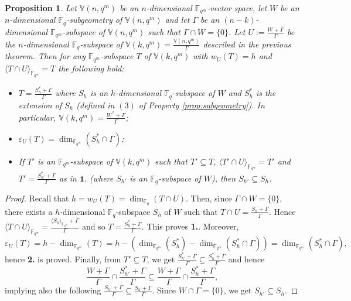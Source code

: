 \documentclass[11pt]{amsart}
\newtheorem{proposition}[theorem]{Proposition}
\newcommand{\fqm}{\mathbb{F}_{q^m}}
\newcommand{\fq}{{\mathbb F}_{q}}
\begin{document}
\begin{proposition} \label{prop:geometricdefect}
    Let $\mathbb{V}(n,q^m)$ be an $n$-dimensional $\fqm$-vector space, let $W$ be an $n$-dimensional $\fq$-subgeometry  of $\mathbb{V}(n,q^m)$  and let $\Gamma$ be an $(n-k)$-dimensional $\fqm$-subspace of $\mathbb{V}(n,q^m)$ such that  
      $\Gamma \cap W=\{ 0\}$. Let $U:=\frac{W+\Gamma}{\Gamma}$ be the $n$-dimensional  $\fq$-subspace of $\mathbb V(k,q^m)=\frac{\mathbb{V}(n,q^m)}{\Gamma}$ described in the previous theorem.
      Then for any $\fqm$-subspace $T$ of $\mathbb V(k,q^m)$ with $w_{U}(T)=h$ and $\langle T \cap U \rangle_{\fqm}=T$ the following hold:
      \begin{itemize}
          \item[\bf 1.] $T=\frac{S_h^*+\Gamma}{\Gamma}$ where $S_h$ is an $h$-dimensional $\fq$-subspace of $W$ and $S_h^*$ is the extension of $S_h$ (defined in $(3)$ of Property \ref{prop:subgeometry}). In particular, $\mathbb V(k,q^m)=\frac{W^*+\Gamma}{\Gamma}$;
          \item[\bf 2.] $\varepsilon_{U}(T)=\dim_{\fqm}(S_h^*\cap \Gamma)$;
          \item[\bf 3.]  If $T'$ is an $\fqm$-subspace of $\mathbb{V}(k,q^m)$ such that $T'\subseteq T$, $\langle T' \cap U \rangle_{\fqm}=T'$ and $T'=\frac{S_{h'}^*+\Gamma}{\Gamma}$ as in $\mathbf 1.$ (where $S_{h'}$ is an $\fq$-subspace of $W$), then $S_{h'} \subseteq S_h$.
      \end{itemize}
\end{proposition}
\begin{proof}

 Recall that $h=w_{U}(T)=\dim_{\fq} ( T \cap U)$.  Then, since $\Gamma \cap W=\{ \underline 0\}$, there exists a $h$-dimensional $\fq$-subspace $S_h$ of $W$ such that $T \cap U=\frac{S_h+\Gamma}{\Gamma}$. Hence $\langle T \cap U \rangle_{\fqm}= \frac{\langle S_h \rangle_{\fqm}+\Gamma}{\Gamma}$ and so $T=\frac{S_h^*+\Gamma}{\Gamma}$. This proves \textbf{1.}. Moreover,
 \[\varepsilon_{U}(T)=h-\dim_{\fqm} (T)=h-(\dim_{\fqm} (S_h^*) - \dim_{\fqm} (S_h^*\cap \Gamma))=\dim_{\fqm} (S_h^*\cap \Gamma), \]
 hence \textbf{2.} is proved.
 Finally, from $T'\subseteq T$, we get $\frac{S_{h'}^*+\Gamma}{\Gamma} \subseteq \frac{S_{h}^*+\Gamma}{\Gamma}$ and hence
 \[\frac{W+\Gamma}{\Gamma} \cap \frac{S_{h'}^*+\Gamma}{\Gamma} \subseteq \frac{W+\Gamma}{\Gamma}\cap \frac{S_{h}^*+\Gamma}{\Gamma},\]
 implying also the following $\frac{S_{h'}+\Gamma}{\Gamma} \subseteq \frac{S_{h}+\Gamma}{\Gamma}$. Since $W\cap \Gamma=\{ 0\}$, we get $S_{h'} \subseteq S_h$. 
\end{proof}
\end{document}
